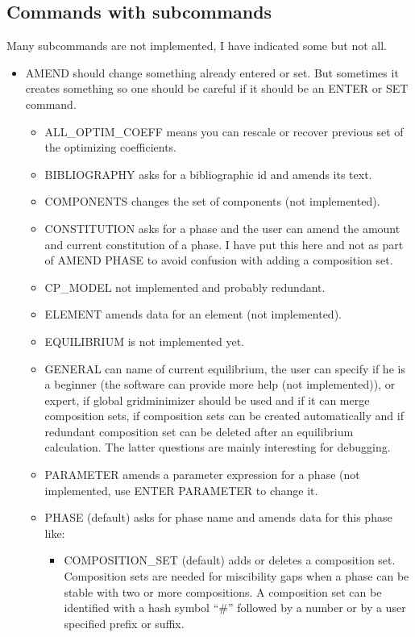\documentclass[12pt]{article}
\begin{document}
\subsection{Commands with subcommands}

Many subcommands are not implemented, I have indicated some but not
all.

\begin{itemize}
\item AMEND should change something already entered or set.  But
  sometimes it creates something so one should be careful if it should
  be an ENTER or SET command.
  \begin{itemize}
  \item ALL\_OPTIM\_COEFF means you can rescale or recover previous
    set of the optimizing coefficients.
  \item BIBLIOGRAPHY asks for a bibliographic id and amends its text.
  \item COMPONENTS changes the set of components (not implemented).
  \item CONSTITUTION asks for a phase and the user can amend the
    amount and current constitution of a phase.  I have put this here
    and not as part of AMEND PHASE to avoid confusion with adding a
    composition set.
  \item CP\_MODEL not implemented and probably redundant.
  \item ELEMENT amends data for an element (not implemented).
  \item EQUILIBRIUM is not implemented yet.
  \item GENERAL can name of current equilibrium, the user can specify
    if he is a beginner (the software can provide more help (not
    implemented)), or expert, if global gridminimizer should be used
    and if it can merge composition sets, if composition sets can be
    created automatically and if redundant composition set can be
    deleted after an equilibrium calculation. The latter questions are
    mainly interesting for debugging.
  \item PARAMETER amends a parameter expression for a phase (not
    implemented, use ENTER PARAMETER to change it.
  \item PHASE (default) asks for phase name and amends data for this
    phase like:
    \begin{itemize}
    \item COMPOSITION\_SET (default) adds or deletes a composition
      set.  Composition sets are needed for miscibility gaps when a
      phase can be stable with two or more compositions.  A
      composition set can be identified with a hash symbol ``\#''
      followed by a number or by a user specified prefix or suffix.
  

\end{itemize}
\end{itemize}
\end{itemize}
\end{document}
